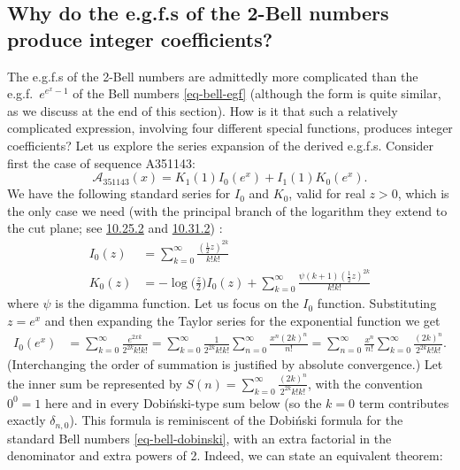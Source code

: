 \documentclass[a4paper]{amsart}
\numberwithin{equation}{section}
\begin{document}
\subsection{Why do the e.g.f.s of the 2-Bell numbers produce integer coefficients?}\label{2-bell-integer-coefs}
The e.g.f.s of the 2-Bell numbers are admittedly more complicated than the e.g.f.\ $e^{e^x-1}$ of the Bell numbers \eqref{eq-bell-egf} (although the form is quite similar, as we discuss at the end of this section). How is it that such a relatively complicated expression, involving four different special functions, produces integer coefficients? Let us explore the series expansion of the derived e.g.f.s. Consider first the case of sequence A351143:
%
\[
\mathcal{A}_{351143}(x) = K_1(1)I_0(e^x) + I_1(1)K_0(e^x).
\]
%
We have the following standard series for $I_0$ and $K_0$, valid for real $z > 0$, which is the only case we need (with the principal branch of the logarithm they extend to the cut plane; see \href{https://dlmf.nist.gov/10.25.E2}{10.25.2} and \href{https://dlmf.nist.gov/10.31.E2}{10.31.2}) \cite{NIST:DLMF}:
%
\begin{equation}
    \begin{aligned}
        I_0(z) &= \sum_{k=0}^{\infty} \frac{(\frac{1}{2}z)^{2k}}{k!k!} \\
        K_0(z) &= -\log\biggl(\frac{z}{2}\biggr)I_0(z) + \sum_{k=0}^{\infty}\frac{\psi(k+1)(\frac{1}{2}z)^{2k}}{k!k!}
    \end{aligned}
\end{equation}
%
where $\psi$ is the digamma function. Let us focus on the $I_0$ function. Substituting $z=e^x$ and then expanding the Taylor series for the exponential function we get
%
\begin{equation}\label{eq-besseli-exp-maclaurin}
\begin{aligned}
I_0(e^x) &= \sum_{k=0}^{\infty} \frac{e^{2xk}}{2^{2k}k!k!} = \sum_{k=0}^{\infty} \frac{1}{2^{2k}k!k!}\sum_{n=0}^{\infty}\frac{x^n(2k)^n}{n!} = \sum_{n=0}^{\infty}\frac{x^n}{n!}\sum_{k=0}^{\infty} \frac{(2k)^n}{2^{2k}k!k!}.
\end{aligned}
\end{equation}
%
(Interchanging the order of summation is justified by absolute convergence.) Let the inner sum be represented by $S(n) = \sum_{k=0}^{\infty} \frac{(2k)^n}{2^{2k}k!k!}$, with the convention $0^0 = 1$ here and in every Dobi\'nski-type sum below (so the $k = 0$ term contributes exactly $\delta_{n,0}$). This formula is reminiscent of the Dobi\'nski formula for the standard Bell numbers \eqref{eq-bell-dobinski}, with an extra factorial in the denominator and extra powers of 2. Indeed, we can state an equivalent theorem:
\end{document}
